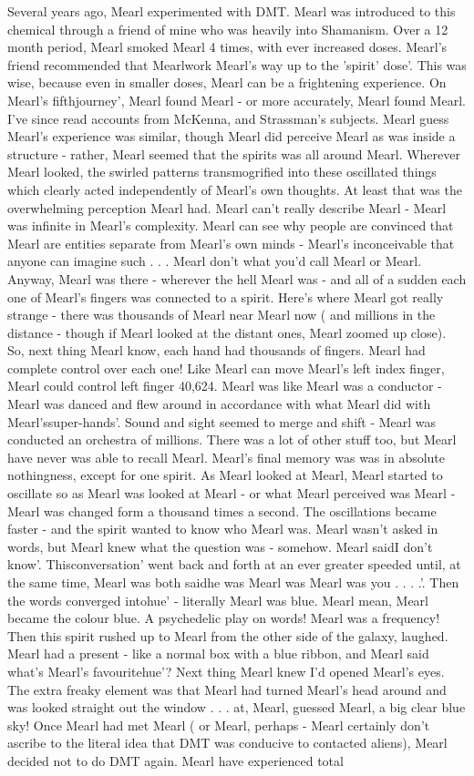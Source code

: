 \documentclass[12pt]{book}
\begin{document}
Several years ago, Mearl experimented with DMT. Mearl was introduced to this chemical through a friend of mine who was heavily into Shamanism. Over a 12 month period, Mearl smoked Mearl 4 times, with ever increased doses. Mearl's friend recommended that Mearlwork Mearl's way up to the 'spirit' dose'. This was wise, because even in smaller doses, Mearl can be a frightening experience. On Mearl's fifthjourney', Mearl found Mearl - or more accurately, Mearl found Mearl. I've since read accounts from McKenna, and Strassman's subjects. Mearl guess Mearl's experience was similar, though Mearl did perceive Mearl as was inside a structure - rather, Mearl seemed that the spirits was all around Mearl. Wherever Mearl looked, the swirled patterns transmogrified into these oscillated things which clearly acted independently of Mearl's own thoughts. At least that was the overwhelming perception Mearl had. Mearl can't really describe Mearl - Mearl was infinite in Mearl's complexity. Mearl can see why people are convinced that Mearl are entities separate from Mearl's own minds - Mearl's inconceivable that anyone can imagine such  . . .  Mearl don't what you'd call Mearl or Mearl. Anyway, Mearl was there - wherever the hell Mearl was - and all of a sudden each one of Mearl's fingers was connected to a spirit. Here's where Mearl got really strange - there was thousands of Mearl near Mearl now ( and millions in the distance - though if Mearl looked at the distant ones, Mearl zoomed up close). So, next thing Mearl know, each hand had thousands of fingers. Mearl had complete control over each one! Like Mearl can move Mearl's left index finger, Mearl could control left finger 40,624. Mearl was like Mearl was a conductor - Mearl was danced and flew around in accordance with what Mearl did with Mearl'ssuper-hands'. Sound and sight seemed to merge and shift - Mearl was conducted an orchestra of millions. There was a lot of other stuff too, but Mearl have never was able to recall Mearl. Mearl's final memory was was in absolute nothingness, except for one spirit. As Mearl looked at Mearl, Mearl started to oscillate so as Mearl was looked at Mearl - or what Mearl perceived was Mearl - Mearl was changed form a thousand times a second. The oscillations became faster - and the spirit wanted to know who Mearl was. Mearl wasn't asked in words, but Mearl knew what the question was - somehow. Mearl saidI don't know'. Thisconversation' went back and forth at an ever greater speeded until, at the same time, Mearl was both saidhe was Mearl was Mearl was you . . .  .'. Then the words converged intohue' - literally Mearl was blue. Mearl mean, Mearl became the colour blue. A psychedelic play on words! Mearl was a frequency! Then this spirit rushed up to Mearl from the other side of the galaxy, laughed. Mearl had a present - like a normal box with a blue ribbon, and Mearl said what's Mearl's favouritehue'? Next thing Mearl knew I'd opened Mearl's eyes. The extra freaky element was that Mearl had turned Mearl's head around and was looked straight out the window . . .  at, Mearl, guessed Mearl, a big clear blue sky! Once Mearl had met Mearl ( or Mearl, perhaps - Mearl certainly don't ascribe to the literal idea that DMT was conducive to contacted aliens), Mearl decided not to do DMT again. Mearl have experienced total 
\end{document}
